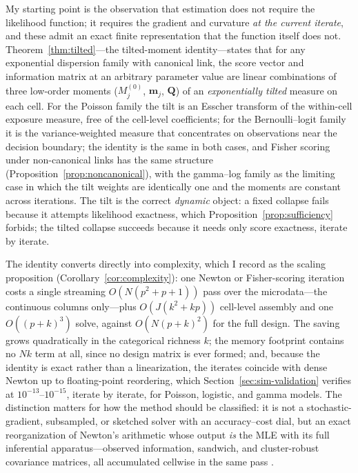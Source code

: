 \documentclass[11pt]{article}
\newcommand{\bQ}{\mathbf{Q}}
\begin{document}
My starting point is the observation that estimation does not require
the likelihood function; it requires the gradient and
curvature \emph{at the current iterate}, and these admit an exact
finite representation that the function itself does not.
Theorem~\ref{thm:tilted}---the tilted-moment identity---states that for
any exponential dispersion family with canonical link, the score vector
and information matrix at an arbitrary parameter value are linear
combinations of three low-order moments ($M^{(0)}_j$, $\mathbf{m}_j$,
$\bQ$) of an \emph{exponentially tilted} measure on each cell.  For the
Poisson family the tilt is an Esscher transform of the within-cell
exposure measure, free of the cell-level coefficients; for the
Bernoulli--logit family it is the variance-weighted measure that
concentrates on observations near the decision boundary; the identity
is the same in both cases, and Fisher scoring under non-canonical links
has the same structure (Proposition~\ref{prop:noncanonical}), with the
gamma--log family as the limiting case in which the tilt weights are
identically one and the moments are constant across iterations.  The
tilt is the correct \emph{dynamic} object: a fixed collapse fails
because it attempts likelihood exactness, which
Proposition~\ref{prop:sufficiency} forbids; the tilted collapse
succeeds because it needs only score exactness, iterate by iterate.

The identity converts directly into complexity, which I record as the
scaling proposition (Corollary~\ref{cor:complexity}): one Newton or
Fisher-scoring iteration costs a single streaming
$O(N(p^2 + p + 1))$ pass over the microdata---the continuous columns
only---plus $O(J(k^2 + kp))$ cell-level assembly and one
$O((p+k)^3)$ solve, against $O(N(p+k)^2)$ for the full design.  The
saving grows quadratically in the categorical richness $k$; the memory
footprint contains no $Nk$ term at all, since no design matrix is ever
formed; and, because the identity is exact rather than a linearization,
the iterates coincide with dense Newton up to floating-point
reordering, which Section~\ref{sec:sim-validation} verifies at
$10^{-13}$--$10^{-15}$, iterate by iterate, for Poisson, logistic, and
gamma models.  The distinction matters for how the method should be
classified: it is not a stochastic-gradient, subsampled, or sketched
solver with an accuracy--cost dial, but an exact reorganization of
Newton's arithmetic whose output \emph{is} the MLE with its full
inferential apparatus---observed information, sandwich, and
cluster-robust covariance matrices, all accumulated cellwise in the
same pass \citep{huber1967,white1980,liang1986}.
\end{document}

